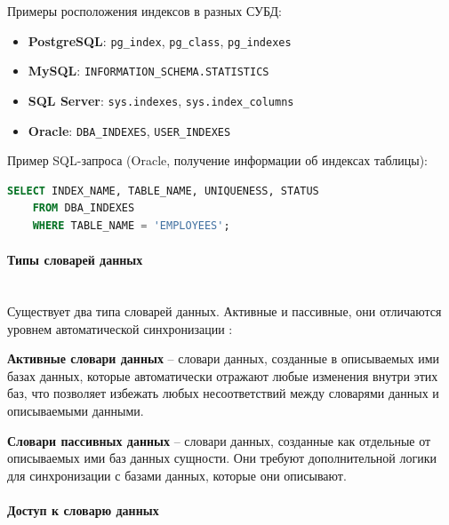 \begin{enumerate}
    Примеры росположения индексов в разных СУБД:
    \begin{itemize}
        \item \textbf{PostgreSQL}: \texttt{pg\_index}, \texttt{pg\_class}, \texttt{pg\_indexes}
        \item \textbf{MySQL}: \texttt{INFORMATION\_SCHEMA.STATISTICS}
        \item \textbf{SQL Server}: \texttt{sys.indexes}, \texttt{sys.index\_columns}
        \item \textbf{Oracle}: \texttt{DBA\_INDEXES}, \texttt{USER\_INDEXES}
    \end{itemize}

    Пример SQL-запроса (Oracle, получение информации об индексах таблицы):
    \begin{lstlisting}[language=SQL]
    SELECT INDEX_NAME, TABLE_NAME, UNIQUENESS, STATUS 
    FROM DBA_INDEXES 
    WHERE TABLE_NAME = 'EMPLOYEES';
    \end{lstlisting}












\end{enumerate}
\paragraph{Типы словарей данных} ~\\

Существует два типа словарей данных. Активные и пассивные, они отличаются уровнем автоматической синхронизации \autocite{DataDictionary}:

\begin{grayquote}
    \textbf{Активные словари данных} -- словари данных, созданные в описываемых ими базах данных, которые автоматически отражают любые изменения внутри этих баз, что позволяет избежать любых несоответствий между словарями данных и описываемыми данными.
\end{grayquote}

\begin{grayquote}
    \textbf{Словари пассивных данных} -- словари данных, созданные как отдельные от описываемых ими баз данных сущности. Они требуют дополнительной логики для синхронизации с базами данных, которые они описывают.
\end{grayquote}

\paragraph{Доступ к словарю данных} ~\\

